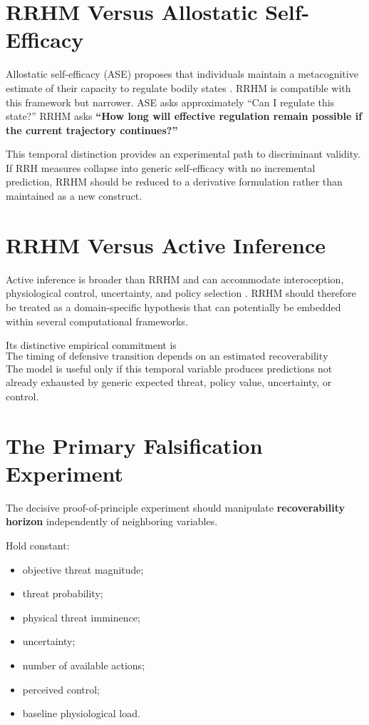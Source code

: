 \documentclass[11pt]{article}
\begin{document}
\section{RRHM Versus Allostatic Self-Efficacy}

Allostatic self-efficacy (ASE) proposes that individuals maintain a metacognitive estimate of their capacity to regulate bodily states \cite{stephan2016}. RRHM is compatible with this framework but narrower. ASE asks approximately ``Can I regulate this state?'' RRHM asks \textbf{``How long will effective regulation remain possible if the current trajectory continues?''}

This temporal distinction provides an experimental path to discriminant validity. If RRH measures collapse into generic self-efficacy with no incremental prediction, RRHM should be reduced to a derivative formulation rather than maintained as a new construct.

\section{RRHM Versus Active Inference}

Active inference is broader than RRHM and can accommodate interoception, physiological control, uncertainty, and policy selection \cite{paulus2019}. RRHM should therefore be treated as a domain-specific hypothesis that can potentially be embedded within several computational frameworks.

Its distinctive empirical commitment is
\[
\boxed{\text{The timing of defensive transition depends on an estimated recoverability horizon.}}
\]
The model is useful only if this temporal variable produces predictions not already exhausted by generic expected threat, policy value, uncertainty, or control.

\section{The Primary Falsification Experiment}

The decisive proof-of-principle experiment should manipulate \textbf{recoverability horizon} independently of neighboring variables.

Hold constant:
\begin{itemize}
\item objective threat magnitude;
\item threat probability;
\item physical threat imminence;
\item uncertainty;
\item number of available actions;
\item perceived control;
\item baseline physiological load.
\end{itemize}
\end{document}

